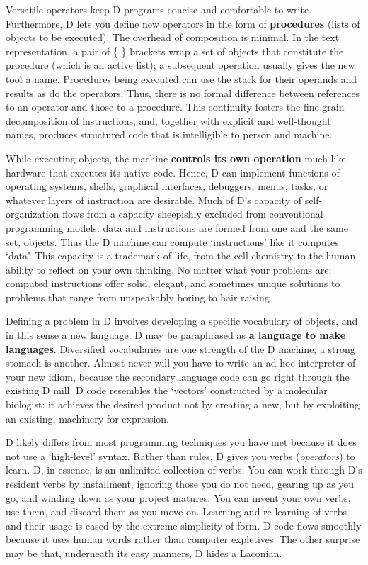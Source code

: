 Versatile  operators keep D programs concise and comfortable  to  write. Furthermore,  D  lets you define new operators in the form of  \textbf{procedures} (lists  of  objects  to be executed).  The  overhead  of  composition  is minimal.  In the text representation, a pair of \{ \} brackets wrap a set of objects  that constitute the procedure (which is an active list);  a subsequent  operation  usually gives the new tool a name.  Procedures being executed can use the  stack for  their operands and results as do the operators.  Thus,  there is  no formal  difference  between  references to an operator  and  those  to  a procedure.   This  continuity  fosters  the  fine-grain  decomposition  of instructions,  and,  together with explicit and well-thought names,  produces structured code that is intelligible to person and machine.

While executing objects,  the machine \textbf{controls its own operation} much like  hardware that executes its native code.  Hence,  D can implement functions of operating systems, shells, graphical interfaces, debuggers, menus, tasks, or  whatever layers of instruction are desirable. Much of D's capacity of self-organization flows from a capacity sheepishly excluded from conventional programming models: data  and instructions are formed from one and the same set, objects. Thus the D  machine can compute `instructions' like it  computes `data'.  This capacity is  a trademark  of life, from the cell chemistry to the human ability to reflect on your own thinking. No matter what your  problems  are: computed  instructions  offer  solid,   elegant,   and  sometimes  unique solutions  to problems that range from unspeakably boring to hair raising.

Defining  a  problem in D involves developing a specific  vocabulary  of objects,  and  in this sense a new language.  D may be paraphrased  as \textbf{a language to make languages}.  Diversified vocabularies are one strength of the D machine; a strong stomach is another. Almost never will you have to write  an  ad hoc interpreter of your new idiom,  because  the  secondary language code can go right through the existing D  mill. D code resembles the `vectors' constructed by a molecular biologist: it achieves the desired product not by creating a new,  but by exploiting an existing,  machinery for expression.

D likely differs from most programming techniques you have met because it does not use a `high-level' syntax. Rather than rules, D gives you verbs (\emph{operators}) to learn. D, in essence, is an unlimited collection of verbs. You  can work through  D's resident verbs by  installment, ignoring those you do not need,  gearing up as you go, and winding down as your project matures. You can invent your own verbs, use them, and discard them as you move on. Learning and re-learning of verbs and their usage is eased by the extreme simplicity of form. D code flows smoothly because it uses human words rather than computer expletives. The other surprise may be that, underneath its easy manners, D hides a Laconian.  

